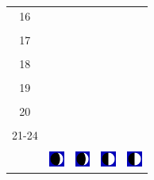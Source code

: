 \documentclass[a4paper,12pt, tikz]{scrartcl}
\begin{document}
\begin{tabularx}{\linewidth}{|c|X|X|p{2cm}|p{2cm}|}
            &   &       &    &   \\
          \hline
          16&   &                 &    &   \\
            &   &       &    &   \\
          \hline
          17&   &                 &    &   \\
            &   &       &    &   \\
          \hline
          18&   &                 &    &   \\
            &   &       &    &   \\
          \hline
          19&   &                 &     &   \\
            &   &       &    &   \\
          \hline
          20&   &              &    &   \\
            &   &       &    &   \\
          \hline 
          21-24&   &              &    &   \\
            &   &       &    &   \\
          \hline
                      & \vspace{0.01cm} \centerline{\includegraphics[width=0.5cm]{moon_phases/Moon_phase_1.svg.png}} \vspace{0.1cm} & \vspace{0.01cm} \centerline{\includegraphics[width=0.5cm]{moon_phases/Moon_phase_1.svg.png}} \vspace{0.1cm} & \vspace{0.01cm} \centerline{\includegraphics[width=0.5cm]{moon_phases/Moon_phase_2.svg.png}} \vspace{0.1cm} & \vspace{0.01cm} \centerline{\includegraphics[width=0.5cm]{moon_phases/Moon_phase_2.svg.png}} \vspace{0.1cm}\\
          \hline    
        \end{tabularx}
\end{document}

